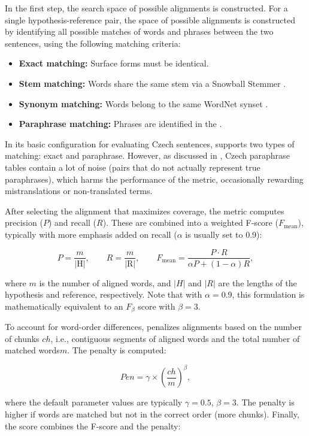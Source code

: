 In the first step, the search space of possible alignments is constructed. For a single hypothesis-reference pair, the space of possible alignments is constructed by identifying all possible matches of words and phrases between the two sentences, using the following matching criteria: 

\begin{itemize}
    \item \textbf{Exact matching:} Surface forms must be identical.
    \item \textbf{Stem matching:} Words share the same stem via a Snowball Stemmer \citep{snowball}.
    \item \textbf{Synonym matching:} Words belong to the same WordNet synset \citep{fellbaum98wordnet}. 
    \item \textbf{Paraphrase matching:} Phrases are identified in the \mpt. 
\end{itemize}

In its basic configuration for evaluating Czech sentences, \mn supports two types of matching: exact and paraphrase. However, as discussed in , Czech paraphrase tables contain a lot of noise (pairs that do not actually represent true paraphrases), which harms the performance of the metric, occasionally rewarding mistranslations or non-translated terms.

After selecting the alignment that maximizes coverage, the metric computes precision ($P$) and recall ($R$). These are combined into a weighted F-score ($F_{\text{mean}}$), typically with more emphasis added on recall ($\alpha$ is usually set to 0.9):

$$
P = \frac{m}{|\text{H}|}, \qquad
R = \frac{m}{|\text{R}|}, \qquad
F_{\text{mean}} = \frac{P \cdot R}{\alpha P + (1 - \alpha) R},
$$

where $m$ is the number of aligned words, and $\lvert H\rvert$ and $\lvert R\rvert$ are the lengths of the hypothesis and reference, respectively. Note that with $\alpha=0.9$, this formulation is mathematically equivalent to an $F_\beta$ score with $\beta=3$.

To account for word-order differences, \mn penalizes alignments based on the number of chunks $ch$, i.e., contiguous segments of aligned words and the total number of matched words$m$. The penalty is computed:

$$
Pen = \gamma \times \left(\frac{ch}{m}\right)^\beta, 
$$

where the default parameter values are typically $\gamma = 0.5$, $\beta = 3$. The penalty is higher if words are matched but not in the correct order (more chunks). Finally, the \mn score combines the F-score and the penalty:

